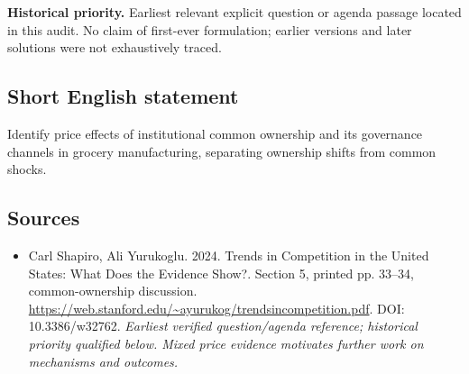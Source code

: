 \documentclass[11pt]{article}
\begin{document}
\par\textbf{Historical priority.} Earliest relevant explicit question or agenda passage located in this audit. No claim of first-ever formulation; earlier versions and later solutions were not exhaustively traced.

\subsection{Short English statement}
Identify price effects of institutional common ownership and its governance channels in grocery manufacturing, separating ownership shifts from common shocks.

\subsection{Sources}
\begin{itemize}\raggedright
\item[\textnormal{[S1]}]\hypertarget{source:30007679:1}{} Carl Shapiro, Ali Yurukoglu. 2024. Trends in Competition in the United States: What Does the Evidence Show?. Section 5, printed pp. 33–34, common-ownership discussion.
\url{https://web.stanford.edu/~ayurukog/trendsincompetition.pdf}.
DOI: 10.3386/w32762.
{\small\textit{Earliest verified question/agenda reference; historical priority qualified below. Mixed price evidence motivates further work on mechanisms and outcomes.}}
\end{itemize}
\end{document}
